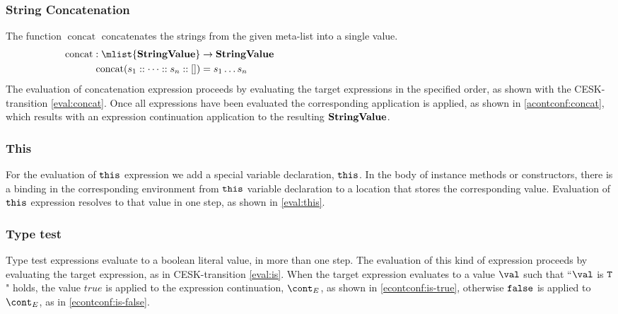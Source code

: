 \documentclass{article}
\DeclareMathOperator{\concat}{concat}
\begin{document}
\subsubsection{String Concatenation}
\label{subsubsec:string-concatenation}
The function $\concat$ concatenates the strings from the given meta-list into a single value.
\begin{align*}
  \concat : \mlist{\dstring} &\rightarrow \dstring \hspace{100mm} \\
  \concat( s_1 :: \dots :: s_n :: []) &= s_1 \dots s_n
\end{align*}
The evaluation of concatenation expression proceeds by evaluating the target expressions in the specified order, as shown with the CESK-transition \eqref{eval:concat}.
Once all expressions have been evaluated the corresponding application is applied, as shown in \eqref{acontconf:concat}, which results with an expression continuation application to the resulting $\mathbf{StringValue}$.
\subsubsection{This}
For the evaluation of $\tt{this}$ expression we add a special variable declaration, $\tt{this}$.
In the body of instance methods or constructors, there is a binding in the corresponding environment from $\tt{this}$ variable declaration to a location that stores the corresponding value.
Evaluation of $\tt{this}$ expression resolves to that value in one step, as shown in \eqref{eval:this}.
\subsubsection{Type test}
\label{subsubsec:type-test}
Type test expressions evaluate to a boolean literal value, in more than one step.
The evaluation of this kind of expression proceeds by evaluating the target expression, as in CESK-transition \eqref{eval:is}.
When the target expression evaluates to a value $\val$ such that ``$\val $ is $\tt{T}$" holds, the value $true$ is applied to the expression continuation, $\econt$, as shown in \eqref{econtconf:is-true}, otherwise $\tt{false}$ is applied to $\econt$, as in \eqref{econtconf:is-false}.
\end{document}
